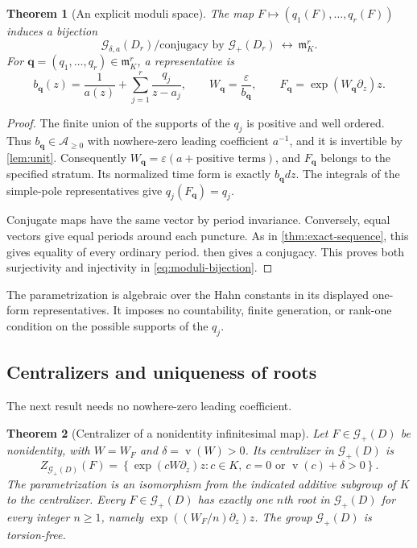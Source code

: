 \documentclass[11pt,a4paper]{article}
\numberwithin{equation}{section}
\newtheorem{theorem}{Theorem}[section]
\theoremstyle{definition}
\theoremstyle{remark}
\newcommand{\A}{\mathcal A}
\newcommand{\G}{\mathcal G}
\newcommand{\mm}{\mathfrak m}
\newcommand{\eps}{\varepsilon}
\newcommand{\val}{\operatorname{v}}
\begin{document}
\begin{theorem}[An explicit moduli space]\label{thm:moduli}
The map $F\mapsto(q_1(F),\ldots,q_r(F))$ induces a bijection
\begin{equation}\label{eq:moduli-bijection}
 \G_{\delta,a}(D_r)/\text{conjugacy by }\G_+(D_r)
       \ \longleftrightarrow\ \mm_K^r.
\end{equation}
For $\mathbf q=(q_1,\ldots,q_r)\in\mm_K^r$, a representative is
\begin{equation}\label{eq:moduli-representative}
 b_{\mathbf q}(z)=\frac1{a(z)}+\sum_{j=1}^r\frac{q_j}{z-a_j},
 \qquad W_{\mathbf q}=\frac{\eps}{b_{\mathbf q}},
 \qquad F_{\mathbf q}=\exp(W_{\mathbf q}\partial_z)z.
\end{equation}
\end{theorem}

\begin{proof}
The finite union of the supports of the $q_j$ is positive and well ordered.
Thus $b_{\mathbf q}\in\A_{\geq0}$ with nowhere-zero leading coefficient
$a^{-1}$, and it is invertible by \cref{lem:unit}.  Consequently
$W_{\mathbf q}=\eps(a+\text{positive terms})$, and
$F_{\mathbf q}$ belongs to the specified stratum.  Its normalized time
form is exactly $b_{\mathbf q}dz$.  The integrals of the simple-pole
representatives give $q_j(F_{\mathbf q})=q_j$.

Conjugate maps have the same vector by period invariance.  Conversely, equal
vectors give equal periods around each puncture.  As in
\cref{thm:exact-sequence}, this gives equality of every ordinary period.
 then gives a conjugacy.  This proves both
surjectivity and injectivity in \eqref{eq:moduli-bijection}.
\end{proof}

The parametrization is algebraic over the Hahn constants in its displayed
one-form representatives.  It imposes no countability, finite generation,
or rank-one condition on the possible supports of the $q_j$.

\subsection{Centralizers and uniqueness of roots}

The next result needs no nowhere-zero leading coefficient.

\begin{theorem}[Centralizer of a nonidentity infinitesimal map]
\label{thm:centralizer}
Let $F\in\G_+(D)$ be nonidentity, with $W=W_F$ and
$\delta=\val(W)>0$.  Its centralizer in $\G_+(D)$ is
\begin{equation}\label{eq:centralizer}
 Z_{\G_+(D)}(F)=
 \left\{\exp(cW\partial_z)z:
 c\in K,\ c=0\text{ or }\val(c)+\delta>0\right\}.
\end{equation}
The parametrization is an isomorphism from the indicated additive subgroup
of $K$ to the centralizer.  Every $F\in\G_+(D)$ has exactly one $n$th
root in $\G_+(D)$ for every integer $n\geq1$, namely
$\exp((W_F/n)\partial_z)z$.  The group $\G_+(D)$ is torsion-free.
\end{theorem}
\end{document}

